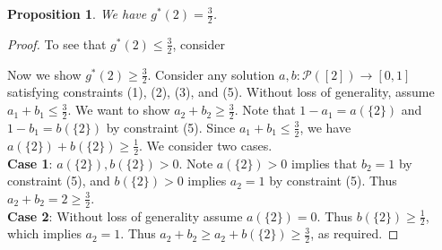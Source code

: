 \documentclass{article}
\newtheorem{proposition}{Proposition}
\begin{document}
\begin{proposition}
We have $g^*(2) = \frac{3}{2}$.
\end{proposition}

\begin{proof}
To see that $g^*(2) \leq \frac{3}{2}$, consider \\

\begin{center}
\end{center}

Now we show $g^*(2) \geq \frac{3}{2}$. Consider any solution $a,b : \mathcal{P}([2]) \rightarrow [0,1]$ satisfying constraints (1), (2), (3), and (5). Without loss of generality, assume $a_1+b_1 \leq \frac{3}{2}$. We want to show $a_2+b_2 \geq \frac{3}{2}$. Note that $1-a_1 = a(\{2\})$ and $1-b_1 = b(\{2\})$ by constraint (5). Since $a_1+b_1 \leq \frac{3}{2}$, we have $a(\{2\}) + b(\{2\}) \geq \frac{1}{2}$. We consider two cases. \\

\textbf{Case 1}: $a(\{2\}),b(\{2\}) > 0$. Note $a(\{2\}) > 0$ implies that $b_2 = 1$ by constraint (5), and $b(\{2\}) > 0$ implies $a_2 = 1$ by constraint (5). Thus $a_2 + b_2 = 2 \geq \frac{3}{2}$. \\

\textbf{Case 2}: Without loss of generality assume $a(\{2\}) = 0$. Thus $b(\{2\}) \geq \frac{1}{2}$, which implies $a_2 = 1$. Thus $a_2 + b_2 \geq a_2 + b(\{2\}) \geq \frac{3}{2}$, as required. 
\end{proof}
\end{document}
